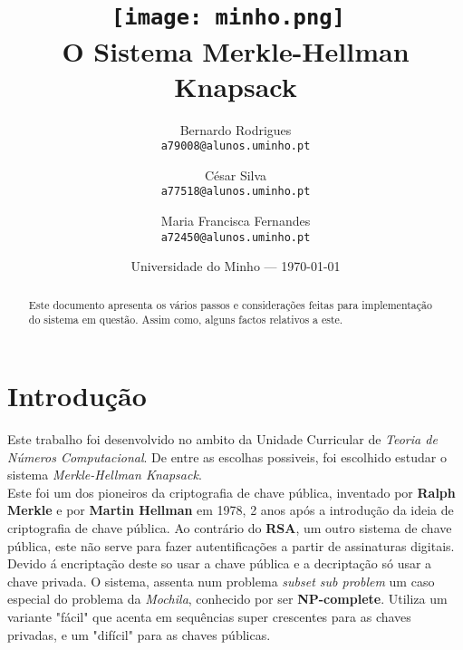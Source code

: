 \documentclass[11pt, language=portuguese]{report}
\begin{document}
\title{\texttt{[image: minho.png]}~\\[1cm] O Sistema Merkle-Hellman Knapsack}

\author{Bernardo Rodrigues\\ \texttt{a79008@alunos.uminho.pt}\\ \and César Silva\\ \texttt{a77518@alunos.uminho.pt}\\ \and Maria Francisca Fernandes\\ \texttt{a72450@alunos.uminho.pt}\\}

\date{Universidade do Minho --- \today}

\maketitle

\begin{abstract}

	Este documento apresenta os vários passos e considerações feitas para implementação do sistema em questão. Assim como, alguns factos relativos a este.


\end{abstract}

\tableofcontents

\listofalgorithms

\chapter{Introdução}

Este trabalho foi desenvolvido no ambito da Unidade Curricular de \textit{Teoria de Números Computacional}. De entre as escolhas possiveis, foi escolhido estudar o sistema \textit{Merkle-Hellman Knapsack}. \\
Este foi um dos pioneiros da criptografia de chave pública, inventado por \textbf{Ralph Merkle} e por \textbf{Martin Hellman} em 1978, 2 anos após a introdução da ideia de criptografia de chave pública.
Ao contrário do \textbf{RSA}, um outro sistema de chave pública, este não serve para fazer autentificações a partir de assinaturas digitais. Devido á encriptação deste so usar a chave pública e a decriptação só usar a chave privada.
O sistema, assenta num problema \textit{subset sub problem} um caso especial do problema da \textit{Mochila}, conhecido por ser \textbf{NP-complete}. Utiliza um variante "fácil" que acenta em sequências super crescentes para as chaves privadas, e um "difícil" para as chaves públicas.
\end{document}
